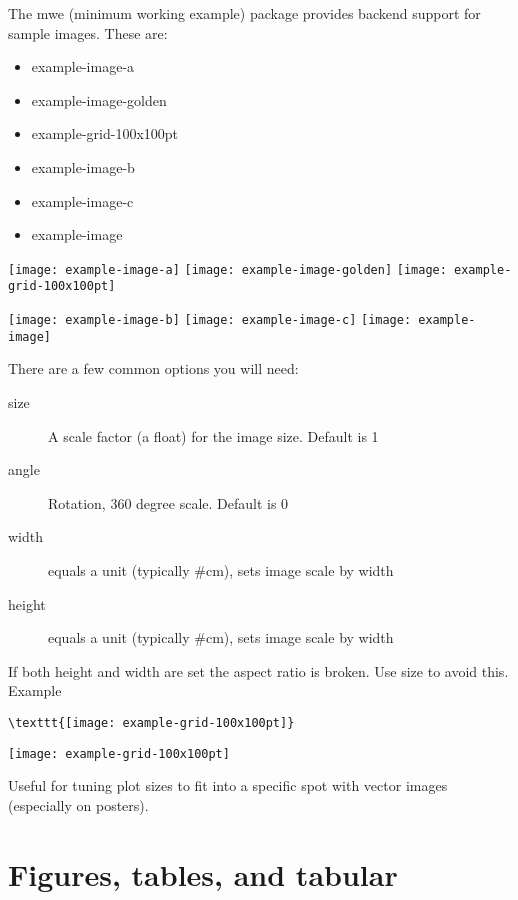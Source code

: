 \documentclass[11pt]{article}
\begin{document}
The mwe (minimum working example) package provides backend support for sample images. These are: \\
\begin{itemize}
	\item example-image-a
	\item example-image-golden
	\item example-grid-100x100pt
	\item example-image-b
	\item example-image-c
	\item example-image
\end{itemize}
\noindent\texttt{[image: example-image-a]}\qquad
\texttt{[image: example-image-golden]}\qquad  %
\texttt{[image: example-grid-100x100pt]}

\texttt{[image: example-image-b]} 
\noindent\texttt{[image: example-image-c]} 
\texttt{[image: example-image]} 

There are a few common options you will need:
\begin{description}
	\item[size] A scale factor (a float) for the image size. Default is 1
	\item[angle] Rotation, 360 degree scale. Default is 0
	\item[width] equals a unit (typically \#cm), sets image scale by width
	\item[height]equals a unit (typically \#cm), sets image scale by width
\end{description}
If both height and width are set the aspect ratio is broken. Use size to avoid this. Example
\begin{verbatim}
\texttt{[image: example-grid-100x100pt]}
\end{verbatim}
\begin{center}
\texttt{[image: example-grid-100x100pt]}
\end{center}

Useful for tuning plot sizes to fit into a specific spot with vector images (especially on posters).
\section{Figures, tables, and tabular}
\end{document}
